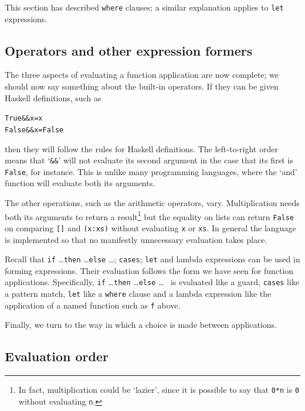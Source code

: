 This section has described \texttt{where} clauses; a similar explanation applies to \texttt{let} expressions.

\subsection*{Operators and other expression formers}

The three aspects of evaluating a function application are now complete; we
should now say something about the built-in operators. If they can be given
Haskell definitions, such as
\begin{alltt}
True  \&\& x = x
False \&\& x = False
\end{alltt}
then they will follow the rules for Haskell definitions. The left-to-right
order means that `\texttt{\&\&}' will not evaluate its second argument in the case that its
first is \texttt{False}, for instance. This is unlike many programming languages, where
the `and' function will evaluate both its arguments.

The other operations, such as the
arithmetic operators, vary. Multiplication \minx{*} needs both its arguments
to return a result\footnote{In fact, multiplication could be `lazier', since it is possible to say that \texttt{0*n} is \texttt{0} without evaluating \texttt{n}.} but the equality 
on lists can return \texttt{False} on
comparing \texttt{[]} and \texttt{(x:xs)} without evaluating \texttt{x} or \texttt{xs}. In
general the language is implemented so that no manifestly
unnecessary evaluation takes
place.

Recall that \texttt{if} \ldots \texttt{then} \ldots \texttt{else} \ldots;
\texttt{cases}; \texttt{let} and lambda
expressions can be used in forming expressions. Their evaluation follows the
form we have seen for function applications. Specifically, 
\texttt{if} \ldots \texttt{then} \ldots \texttt{else} \ldots
\ is evaluated like a guard, \texttt{cases} like a pattern match, 
\texttt{let} like a \texttt{where} clause and a lambda expression like the application of
a named function such as \texttt{f} above.

Finally, we turn to the way in which a choice is made between applications.
              
\subsection*{Evaluation order}

